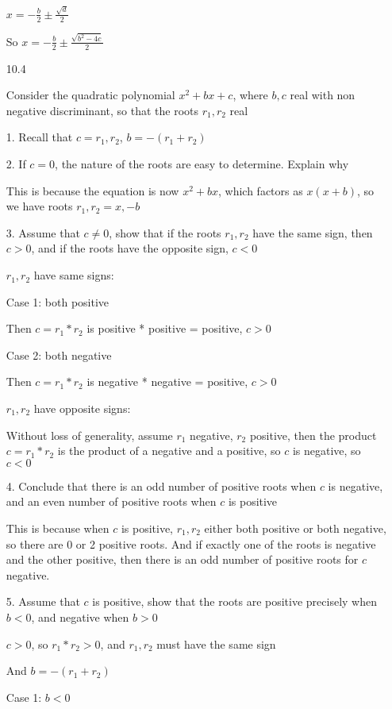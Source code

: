 \documentclass[12pt]{article}
\begin{document}
\begin{itemize}
		$x = -\frac{b}{2} \pm \frac{\sqrt{d}}{2}$

		So $x = -\frac{b}{2} \pm \frac{\sqrt{b^2 - 4c}}{2}$

\newpage

\item[10.4]

	Consider the quadratic polynomial $x^2 + bx + c$, where $b,c$ real with non negative discriminant, so that the roots $r_1, r_2$ real

		1. Recall that $c = r_1, r_2$, $b = -(r_1 + r_2)$

	2. If $c = 0$, the nature of the roots are easy to determine. Explain why

		This is because the equation is now $x^2 + bx$, which factors as $x(x + b)$, so we have roots $r_1, r_2 = x, -b$

	3. Assume that $c \neq 0$, show that if the roots $r_1, r_2$ have the same sign, then $c > 0$, and if the roots have the opposite sign, $c < 0$

		$r_1, r_2$ have same signs:

		Case 1: both positive

		Then $c = r_1 * r_2$ is positive * positive = positive, $c > 0$

		Case 2: both negative

		Then $c = r_1 * r_2$ is negative * negative = positive, $c > 0$

		$r_1, r_2$ have opposite signs:

		Without loss of generality, assume $r_1$ negative, $r_2$ positive, then the product $c = r_1 * r_2$ is the product of a negative and a positive, so $c$ is negative, so $c < 0$

	4. Conclude that there is an odd number of positive roots when $c$ is negative, and an even number of positive roots when $c$ is positive

		This is because when $c$ is positive, $r_1, r_2$ either both positive or both negative, so there are 0 or 2 positive roots. And if exactly one of the roots is negative and the other positive, then there is an odd number of positive roots for $c$ negative.

	5. Assume that $c$ is positive, show that the roots are positive precisely when $b  < 0$, and negative when $b > 0$

		$c > 0$, so $r_1*r_2 > 0$, and $r_1, r_2$ must have the same sign

		And $b = -(r_1 + r_2)$

		Case 1: $b < 0$


\end{itemize}
\end{document}
